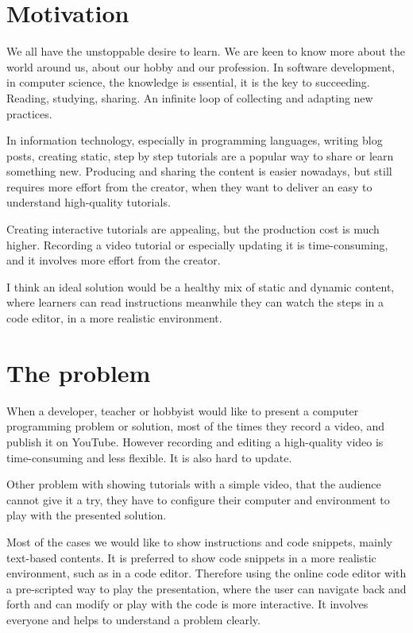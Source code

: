 \documentclass[11pt, a4paper, oneside, openright, medskipamount]{report}
\begin{document}
\section{Motivation}

We all have the unstoppable desire to learn. We are keen to know more about the world around us, about our hobby and our profession. In software development, in computer science, the knowledge is essential, it is the key to succeeding. Reading, studying, sharing. An infinite loop of collecting and adapting new practices.

In information technology, especially in programming languages, writing blog posts, creating static, step by step tutorials are a popular way to share or learn something new. Producing and sharing the content is easier nowadays, but still requires more effort from the creator, when they want to deliver an easy to understand high-quality tutorials.

Creating interactive tutorials are appealing, but the production cost is much higher. Recording a video tutorial or especially updating it is time-consuming, and it involves more effort from the creator.

I think an ideal solution would be a healthy mix of static and dynamic content, where learners can read instructions meanwhile they can watch the steps in a code editor, in a more realistic environment.

\section{The problem}

When a developer, teacher or hobbyist would like to present a computer programming problem or solution, most of the times they record a video, and publish it on YouTube. However recording and editing a high-quality video is time-consuming and less flexible. It is also hard to update.

Other problem with showing tutorials with a simple video, that the audience cannot give it a try, they have to configure their computer and environment to play with the presented solution.

Most of the cases we would like to show instructions and code snippets, mainly text-based contents. It is preferred to show code snippets in a more realistic environment, such as in a code editor. Therefore using the online code editor with a pre-scripted way to play the presentation, where the user can navigate back and forth and can modify or play with the code is more interactive. It involves everyone and helps to understand a problem clearly.
\end{document}

